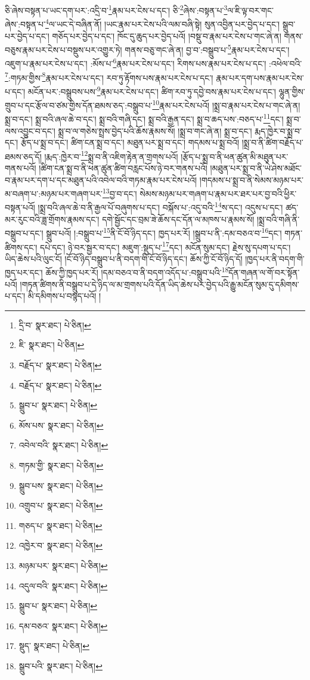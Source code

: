 ཅི་ཞེས་བསྟན་པ་ཡང་དག་པར་:འདྲི་བ་\footnote{དྲི་བ་  སྣར་ཐང་།  པེ་ཅིན། }རྣམ་པར་ངེས་པ་དང་། ཅི་\footnote{ཇི་  སྣར་ཐང་།  པེ་ཅིན། }ཞེས་:བསྟན་པ་\footnote{བརྗོད་པ་  སྣར་ཐང་།  པེ་ཅིན། }ལ་ཇི་ལྟ་བར་གང་ཞེས་:བསྟན་པ་\footnote{བརྗོད་པ་  སྣར་ཐང་།  པེ་ཅིན། }ལ་ཡང་དེ་བཞིན་ནོ། །ཡང་རྣམ་པར་ངེས་པའི་ལམ་བཞི་སྟེ། སུན་འབྱིན་པར་བྱེད་པ་དང་། སྒྲུབ་པར་བྱེད་པ་དང་། གཅོད་པར་བྱེད་པ་དང་། ཁོང་དུ་ཆུད་པར་བྱེད་པའོ། །བསྡུ་བ་རྣམ་པར་ངེས་པ་གང་ཞེ་ན། གནས་བཅུས་རྣམ་པར་ངེས་པ་བསྡུས་པར་འགྱུར་ཏེ། གནས་བཅུ་གང་ཞེ་ན། བྱ་བ་:བསྒྲུབ་པ་\footnote{སྒྲུབ་པ་  སྣར་ཐང་།  པེ་ཅིན། }རྣམ་པར་ངེས་པ་དང་། འཇུག་པ་རྣམ་པར་ངེས་པ་དང་། :མོས་པ་\footnote{མོས་པས་  སྣར་ཐང་།  པེ་ཅིན། }རྣམ་པར་ངེས་པ་དང་། རིགས་པས་རྣམ་པར་ངེས་པ་དང་། :འཕེལ་བའི་\footnote{འབེལ་བའི་  སྣར་ཐང་།  པེ་ཅིན། }:གཏམ་གྱིས་\footnote{གཏམ་གྱི་  སྣར་ཐང་།  པེ་ཅིན། }རྣམ་པར་ངེས་པ་དང་། རབ་ཏུ་རྟོགས་པས་རྣམ་པར་ངེས་པ་དང་། རྣམ་པར་དག་པས་རྣམ་པར་ངེས་པ་དང་། མངོན་པར་:བསྒྲུབས་པས་\footnote{སྒྲུབ་པས་  སྣར་ཐང་།  པེ་ཅིན། }རྣམ་པར་ངེས་པ་དང་། ཚིག་རབ་ཏུ་དབྱེ་བས་རྣམ་པར་ངེས་པ་དང་། ལྷུན་གྱིས་གྲུབ་པ་དང་རྩོལ་བ་ཙམ་གྱིས་དོན་ཐམས་ཅད་:བསྒྲུབ་པ་\footnote{འགྲུབ་པ་  སྣར་ཐང་།  པེ་ཅིན། }རྣམ་པར་ངེས་པའོ། །སྨྲ་བ་རྣམ་པར་ངེས་པ་གང་ཞེ་ན། སྨྲ་བ་དང་། སྨྲ་བའི་ཞལ་ཆེ་བ་དང་། སྨྲ་བའི་གཞི་དང་། སྨྲ་བའི་རྒྱན་དང་། སྨྲ་བ་ཆད་པས་:བཅད་པ་\footnote{གཅད་པ་  སྣར་ཐང་།  པེ་ཅིན། }དང་། སྨྲ་བ་ལས་འབྱུང་བ་དང་། སྨྲ་བ་ལ་གཅེས་སྤྲས་བྱེད་པའི་ཆོས་རྣམས་སོ། །སྨྲ་བ་གང་ཞེ་ན། སྨྲ་བ་དང་། རྨད་ཁྱེར་བ་སྨྲ་བ་དང་། རྩོད་པ་སྨྲ་བ་དང་། ཚིག་ངན་སྨྲ་བ་དང་། མཐུན་པར་སྨྲ་བ་དང་། གདམས་པ་སྨྲ་བའོ། །སྨྲ་བ་ནི་ཚིག་བརྗོད་པ་ཐམས་ཅད་དོ། །རྨད་:ཁྱེར་བ་\footnote{འཁྱེར་བ་  སྣར་ཐང་།  པེ་ཅིན། }སྨྲ་བ་ནི་འཇིག་རྟེན་ན་གྲགས་པའོ། །རྩོད་པ་སྨྲ་བ་ནི་ཕན་ཚུན་མི་མཐུན་པར་གནས་པའོ། །ཚིག་ངན་སྨྲ་བ་ནི་ཕན་ཚུན་ཚིག་བརླང་པོས་ཉེ་བར་གནས་པའོ། །མཐུན་པར་སྨྲ་བ་ནི་ཡེ་ཤེས་མཐོང་བ་རྣམ་པར་དག་པ་དང་མཐུན་པའི་འབེལ་བའི་གཏམ་རྣམ་པར་ངེས་པའོ། །གདམས་པ་སྨྲ་བ་ནི་སེམས་མཉམ་པར་མ་བཞག་པ་:མཉམ་པར་གཞག་པར་\footnote{མཉམ་པར་  སྣར་ཐང་།  པེ་ཅིན། }བྱ་བ་དང་། སེམས་མཉམ་པར་གཞག་པ་རྣམ་པར་ཐར་པར་བྱ་བའི་ཕྱིར་བསྟན་པའོ། །སྨྲ་བའི་ཞལ་ཆེ་བ་ནི་རྒྱལ་པོ་བཞུགས་པ་དང་། བསྐོས་པ་:འདུ་བའི་\footnote{འདུལ་བའི་  སྣར་ཐང་།  པེ་ཅིན། }ས་དང་། འདུས་པ་དང་། ཚད་མར་རུང་བའི་ཟླ་གྲོགས་རྣམས་དང་། དགེ་སྦྱོང་དང་བྲམ་ཟེ་ཆོས་དང་དོན་ལ་མཁས་པ་རྣམས་སོ། །སྨྲ་བའི་གཞི་ནི་བསྒྲུབ་པ་དང་། སྒྲུབ་པའོ། །:བསྒྲུབ་པ་\footnote{སྒྲུབ་པ་  སྣར་ཐང་།  པེ་ཅིན། }ནི་ངོ་བོ་ཉིད་དང་། ཁྱད་པར་རོ། །སྒྲུབ་པ་ནི་:དམ་བཅའ་བ་\footnote{དམ་བཅའ་  སྣར་ཐང་།  པེ་ཅིན། }དང་། གཏན་ཚིགས་དང་། དཔེ་དང་། ཉེ་བར་སྦྱར་བ་དང་། མཇུག་:སྡུད་པ་\footnote{སྡུད་  སྣར་ཐང་།  པེ་ཅིན། }དང་། མངོན་སུམ་དང་། རྗེས་སུ་དཔག་པ་དང་། ཡིད་ཆེས་པའི་ལུང་ངོ། །ངོ་བོ་ཉིད་བསྒྲུབ་པ་ནི་བདག་གི་ངོ་བོ་ཉིད་དང་། ཆོས་ཀྱི་ངོ་བོ་ཉིད་དོ། །ཁྱད་པར་ནི་བདག་གི་ཁྱད་པར་དང་། ཆོས་ཀྱི་ཁྱད་པར་རོ། །དམ་བཅའ་བ་ནི་བདག་འདོད་པ་:བསྒྲུབ་པའི་\footnote{སྒྲུབ་པའི་  སྣར་ཐང་།  པེ་ཅིན། }དོན་གཞན་ལ་གོ་བར་སྟོན་པའོ། །གཏན་ཚིགས་ནི་བསྒྲུབ་པ་དེ་ཉིད་ལ་མ་གྲགས་པའི་དོན་ཡིད་ཆེས་པར་བྱེད་པའི་རྒྱུ་མངོན་སུམ་དུ་དམིགས་པ་དང་། མི་དམིགས་པ་བསྙད་པའོ། །
